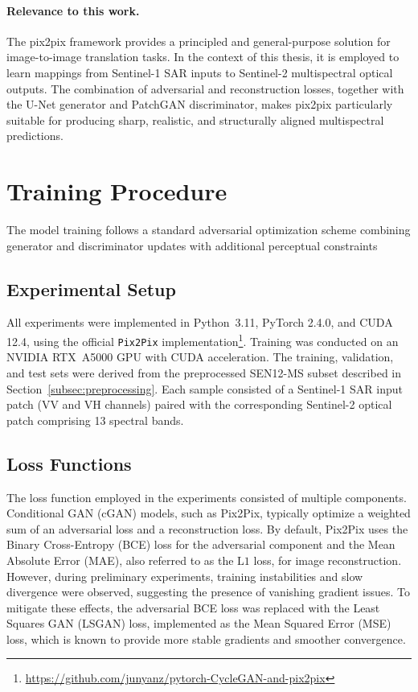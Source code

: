 \paragraph{Relevance to this work.}  
The pix2pix framework provides a principled and general-purpose solution for image-to-image translation tasks. In the context of this thesis, it is employed to learn mappings from Sentinel-1 SAR inputs to Sentinel-2 multispectral optical outputs. The combination of adversarial and reconstruction losses, together with the U-Net generator and PatchGAN discriminator, makes pix2pix particularly suitable for producing sharp, realistic, and structurally aligned multispectral predictions.

\section{Training Procedure}
The model training follows a standard adversarial optimization scheme combining generator and discriminator updates with additional perceptual constraints

\subsection{Experimental Setup} All experiments were implemented in Python~3.11, PyTorch 2.4.0, and CUDA 12.4, using the official \texttt{Pix2Pix} implementation\footnote{\url{https://github.com/junyanz/pytorch-CycleGAN-and-pix2pix}}. Training was conducted on an NVIDIA RTX~A5000 GPU with CUDA acceleration. The training, validation, and test sets were derived from the preprocessed SEN12-MS subset described in Section~\ref{subsec:preprocessing}. Each sample consisted of a Sentinel-1 SAR input patch (VV and VH channels) paired with the corresponding Sentinel-2 optical patch comprising 13 spectral bands.

\subsection{Loss Functions}
\label{subsec:losses}
The loss function employed in the experiments consisted of multiple components. Conditional GAN (cGAN) models, such as Pix2Pix, typically optimize a weighted sum of an adversarial loss and a reconstruction loss. By default, Pix2Pix uses the Binary Cross-Entropy (BCE) loss for the adversarial component and the Mean Absolute Error (MAE), also referred to as the $\mathrm{L1}$ loss, for image reconstruction. However, during preliminary experiments, training instabilities and slow divergence were observed, suggesting the presence of vanishing gradient issues. To mitigate these effects, the adversarial BCE loss was replaced with the Least Squares GAN (LSGAN) loss, implemented as the Mean Squared Error (MSE) loss, which is known to provide more stable gradients and smoother convergence.

